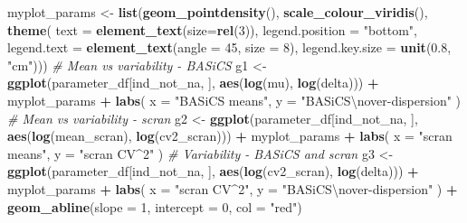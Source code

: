 \documentclass[9pt,a4paper,]{extarticle}
\newenvironment{Shaded}{\begin{snugshade}}{\end{snugshade}}
\newcommand{\CharTok}[1]{\textcolor[rgb]{0.31,0.60,0.02}{#1}}
\newcommand{\CommentTok}[1]{\textcolor[rgb]{0.56,0.35,0.01}{\textit{#1}}}
\newcommand{\DataTypeTok}[1]{\textcolor[rgb]{0.13,0.29,0.53}{#1}}
\newcommand{\DecValTok}[1]{\textcolor[rgb]{0.00,0.00,0.81}{#1}}
\newcommand{\FloatTok}[1]{\textcolor[rgb]{0.00,0.00,0.81}{#1}}
\newcommand{\KeywordTok}[1]{\textcolor[rgb]{0.13,0.29,0.53}{\textbf{#1}}}
\newcommand{\NormalTok}[1]{#1}
\newcommand{\OperatorTok}[1]{\textcolor[rgb]{0.81,0.36,0.00}{\textbf{#1}}}
\newcommand{\StringTok}[1]{\textcolor[rgb]{0.31,0.60,0.02}{#1}}
\begin{document}
\begin{Shaded}
\begin{Highlighting}[]
\NormalTok{myplot_params <-}\StringTok{ }\KeywordTok{list}\NormalTok{(}\KeywordTok{geom_pointdensity}\NormalTok{(),}
                      \KeywordTok{scale_colour_viridis}\NormalTok{(),}
                      \KeywordTok{theme}\NormalTok{(}
                        \DataTypeTok{text =} \KeywordTok{element_text}\NormalTok{(}\DataTypeTok{size=}\KeywordTok{rel}\NormalTok{(}\DecValTok{3}\NormalTok{)),}
                        \DataTypeTok{legend.position =} \StringTok{"bottom"}\NormalTok{,}
                        \DataTypeTok{legend.text =} \KeywordTok{element_text}\NormalTok{(}\DataTypeTok{angle =} \DecValTok{45}\NormalTok{, }\DataTypeTok{size =} \DecValTok{8}\NormalTok{),}
                        \DataTypeTok{legend.key.size =}  \KeywordTok{unit}\NormalTok{(}\FloatTok{0.8}\NormalTok{, }\StringTok{"cm"}\NormalTok{)))}
\CommentTok{# Mean vs variability - BASiCS}
\NormalTok{g1 <-}\StringTok{ }\KeywordTok{ggplot}\NormalTok{(parameter_df[ind_not_na, ], }\KeywordTok{aes}\NormalTok{(}\KeywordTok{log}\NormalTok{(mu), }\KeywordTok{log}\NormalTok{(delta))) }\OperatorTok{+}
\StringTok{  }\NormalTok{myplot_params }\OperatorTok{+}
\StringTok{  }\KeywordTok{labs}\NormalTok{(}
    \DataTypeTok{x =} \StringTok{"BASiCS means"}\NormalTok{,}
    \DataTypeTok{y =} \StringTok{"BASiCS}\CharTok{\textbackslash{}n}\StringTok{over-dispersion"}
\NormalTok{  )}
\CommentTok{# Mean vs variability - scran}
\NormalTok{g2 <-}\StringTok{ }\KeywordTok{ggplot}\NormalTok{(parameter_df[ind_not_na, ], }\KeywordTok{aes}\NormalTok{(}\KeywordTok{log}\NormalTok{(mean_scran), }\KeywordTok{log}\NormalTok{(cv2_scran))) }\OperatorTok{+}
\StringTok{  }\NormalTok{myplot_params }\OperatorTok{+}
\StringTok{  }\KeywordTok{labs}\NormalTok{(}
    \DataTypeTok{x =} \StringTok{"scran means"}\NormalTok{,}
    \DataTypeTok{y =} \StringTok{"scran CV^2"}
\NormalTok{  )}
\CommentTok{# Variability - BASiCS and scran}
\NormalTok{g3 <-}\StringTok{ }\KeywordTok{ggplot}\NormalTok{(parameter_df[ind_not_na, ], }\KeywordTok{aes}\NormalTok{(}\KeywordTok{log}\NormalTok{(cv2_scran), }\KeywordTok{log}\NormalTok{(delta))) }\OperatorTok{+}
\StringTok{  }\NormalTok{myplot_params }\OperatorTok{+}
\StringTok{  }\KeywordTok{labs}\NormalTok{(}
    \DataTypeTok{x =} \StringTok{"scran CV^2"}\NormalTok{,}
    \DataTypeTok{y =} \StringTok{"BASiCS}\CharTok{\textbackslash{}n}\StringTok{over-dispersion"}
\NormalTok{  ) }\OperatorTok{+}
\StringTok{  }\KeywordTok{geom_abline}\NormalTok{(}\DataTypeTok{slope =} \DecValTok{1}\NormalTok{, }\DataTypeTok{intercept =} \DecValTok{0}\NormalTok{, }\DataTypeTok{col =} \StringTok{"red"}\NormalTok{)}


\end{Highlighting}
\end{Shaded}
\end{document}

